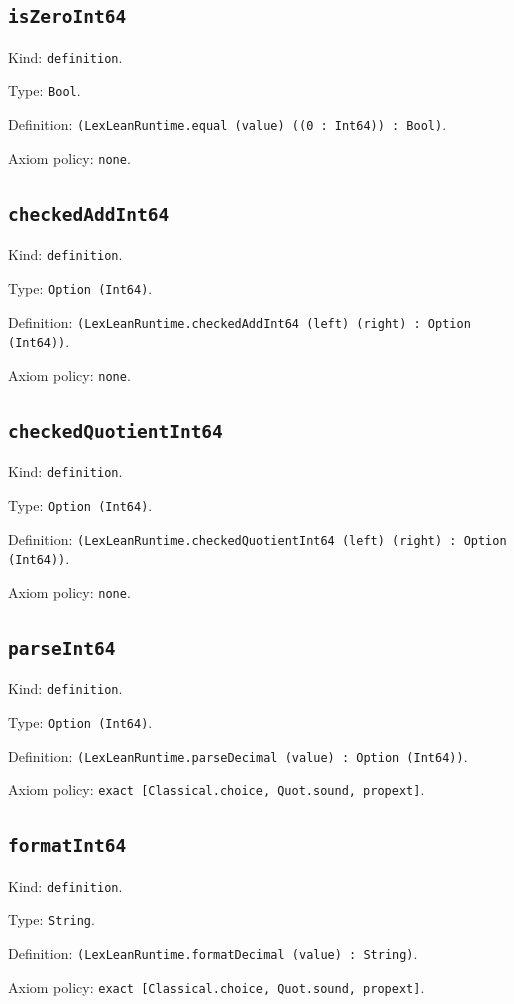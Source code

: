 \documentclass[11pt]{article}
\begin{document}
\subsection*{\texttt{isZeroInt64}}
\noindent Kind: \texttt{definition}.\par
\noindent Type: \texttt{Bool}.\par
\noindent Definition: \texttt{(LexLeanRuntime.equal (value) ((0 : Int64)) : Bool)}.\par
\noindent Axiom policy: \texttt{none}.\par
\subsection*{\texttt{checkedAddInt64}}
\noindent Kind: \texttt{definition}.\par
\noindent Type: \texttt{Option (Int64)}.\par
\noindent Definition: \texttt{(LexLeanRuntime.checkedAddInt64 (left) (right) : Option (Int64))}.\par
\noindent Axiom policy: \texttt{none}.\par
\subsection*{\texttt{checkedQuotientInt64}}
\noindent Kind: \texttt{definition}.\par
\noindent Type: \texttt{Option (Int64)}.\par
\noindent Definition: \texttt{(LexLeanRuntime.checkedQuotientInt64 (left) (right) : Option (Int64))}.\par
\noindent Axiom policy: \texttt{none}.\par
\subsection*{\texttt{parseInt64}}
\noindent Kind: \texttt{definition}.\par
\noindent Type: \texttt{Option (Int64)}.\par
\noindent Definition: \texttt{(LexLeanRuntime.parseDecimal (value) : Option (Int64))}.\par
\noindent Axiom policy: \texttt{exact [Classical.choice, Quot.sound, propext]}.\par
\subsection*{\texttt{formatInt64}}
\noindent Kind: \texttt{definition}.\par
\noindent Type: \texttt{String}.\par
\noindent Definition: \texttt{(LexLeanRuntime.formatDecimal (value) : String)}.\par
\noindent Axiom policy: \texttt{exact [Classical.choice, Quot.sound, propext]}.\par
\end{document}
